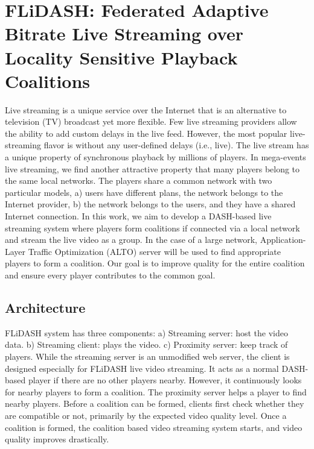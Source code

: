 \section{FLiDASH: Federated Adaptive Bitrate Live Streaming over Locality Sensitive Playback Coalitions}
Live streaming is a unique service over the Internet that is an alternative to television (TV) broadcast yet more flexible. Few live streaming providers allow the ability to add custom delays in the live feed. However, the most popular live-streaming flavor is without any user-defined delays (i.e., live). The live stream has a unique property of synchronous playback by millions of players. In mega-events live streaming, we find another attractive property that many players belong to the same local networks. The players share a common network with two particular models, a) users have different plans, the network belongs to the Internet provider, b) the network belongs to the users, and they have a shared Internet connection. In this work, we aim to develop a DASH-based live streaming system where players form coalitions if connected via a local network and stream the live video as a group. In the case of a large network, Application-Layer Traffic Optimization (ALTO) server will be used to find appropriate players to form a coalition. Our goal is to improve quality for the entire coalition and ensure every player contributes to the common goal.

\subsection{Architecture}
FLiDASH system has three components: a) Streaming server: host the video data. b) Streaming client: plays the video. c) Proximity server: keep track of players. While the streaming server is an unmodified web server, the client is designed especially for FLiDASH live video streaming. It acts as a normal DASH-based player if there are no other players nearby. However, it continuously looks for nearby players to form a coalition. The proximity server helps a player to find nearby players. Before a coalition can be formed, clients first check whether they are compatible or not, primarily by the expected video quality level. Once a coalition is formed, the coalition based video streaming system starts, and video quality improves drastically.
